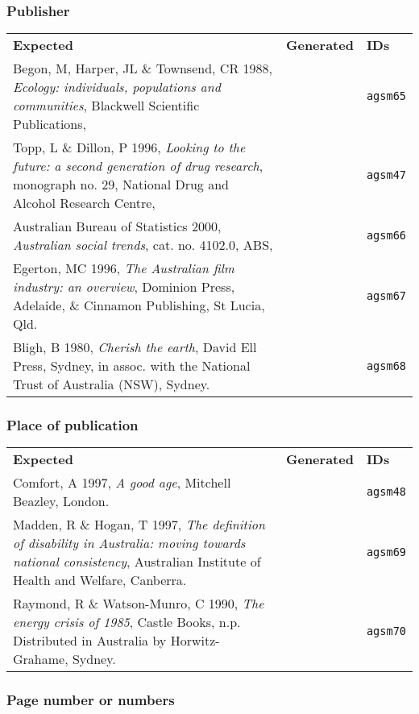 \documentclass[a4paper,landscape,12pt]{article}
\newlength\q
\newlength\qr
\newenvironment{citetable}
  {\noindent\begin{longtable}{p{\q} p{\q} p{\qr}}\textbf{Expected} & \textbf{Generated} & \textbf{IDs}\\}
  {\end{longtable}}
\begin{document}
\subsubsection{Publisher}

\begin{citetable}
	Begon, M, Harper, JL \& Townsend, CR 1988, \textit{Ecology: individuals, populations and communities}, Blackwell Scientific Publications, & \fullcite{agsm65} & \texttt{agsm65} \\
	Topp, L \& Dillon, P 1996, \textit{Looking to the future: a second generation of drug research}, monograph no. 29, National Drug and Alcohol Research Centre, & \fullcite{agsm47} & \texttt{agsm47} \\
	Australian Bureau of Statistics 2000, \textit{Australian social trends}, cat. no. 4102.0, ABS, & \fullcite{agsm66} & \texttt{agsm66} \\
	Egerton, MC 1996, \textit{The Australian film industry: an overview}, Dominion Press, Adelaide, \& Cinnamon Publishing, St Lucia, Qld. & \fullcite{agsm67} & \texttt{agsm67} \\
	Bligh, B 1980, \textit{Cherish the earth}, David Ell Press, Sydney, in assoc. with the National Trust of Australia (NSW), Sydney. & \fullcite{agsm68} & \texttt{agsm68} \\
\end{citetable}

\subsubsection{Place of publication}

\begin{citetable}
	Comfort, A 1997, \textit{A good age}, Mitchell Beazley, London. & \fullcite{agsm48} & \texttt{agsm48} \\
	Madden, R \& Hogan, T 1997, \textit{The definition of disability in Australia: moving towards national consistency}, Australian Institute of Health and Welfare, Canberra. & \fullcite{agsm69} & \texttt{agsm69} \\
	Raymond, R \& Watson-Munro, C 1990, \textit{The energy crisis of 1985}, Castle Books, n.p. Distributed in Australia by Horwitz-Grahame, Sydney. & \fullcite{agsm70} & \texttt{agsm70} \\
\end{citetable}

\subsubsection{Page number or numbers}
\end{document}
